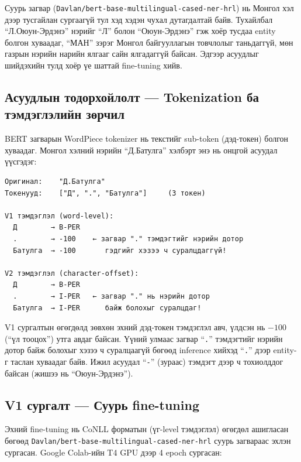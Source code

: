 Суурь загвар (\texttt{Davlan/bert-base-multilingual-cased-ner-hrl}) нь Монгол хэл дээр тусгайлан сургаагүй тул хэд хэдэн чухал дутагдалтай байв. Тухайлбал ``Л.Оюун-Эрдэнэ'' нэрийг ``Л'' болон ``Оюун-Эрдэнэ'' гэж хоёр тусдаа entity болгон хуваадаг, ``МАН'' зэрэг Монгол байгууллагын товчлолыг таньдаггүй, мөн газрын нэрийн нарийн ялгааг сайн ялгадаггүй байсан. Эдгээр асуудлыг шийдэхийн тулд хоёр үе шаттай fine-tuning хийв.

\subsection{Асуудлын тодорхойлолт — Tokenization ба тэмдэглэлийн зөрчил}

BERT загварын WordPiece tokenizer нь текстийг sub-token (дэд-токен) болгон хуваадаг. Монгол хэлний нэрийн ``Д.Батулга'' хэлбэрт энэ нь онцгой асуудал үүсгэдэг:

\begin{lstlisting}[caption={WordPiece tokenization — цэг дээр хуваагдах жишээ}, basicstyle=\small\ttfamily, breaklines=true, frame=single]
Оригинал:    "Д.Батулга"
Токенууд:    ["Д", ".", "Батулга"]     (3 токен)

V1 тэмдэглэл (word-level):
  Д        → B-PER
  .        → -100    ← загвар "." тэмдэгтийг нэрийн дотор
  Батулга  → -100       гэдгийг хэзээ ч суралцдаггүй!

V2 тэмдэглэл (character-offset):
  Д        → B-PER
  .        → I-PER   ← загвар "." нь нэрийн дотор
  Батулга  → I-PER      байж болохыг суралцдаг!
\end{lstlisting}

V1 сургалтын өгөгдөлд зөвхөн эхний дэд-токен тэмдэглэл авч, үлдсэн нь $-100$ (``үл тооцох'') утга авдаг байсан. Үүний улмаас загвар ``\texttt{.}'' тэмдэгтийг нэрийн дотор байж болохыг хэзээ ч суралцаагүй бөгөөд inference хийхэд ``\texttt{.}'' дээр entity-г таслан хуваадаг байв. Ижил асуудал ``\texttt{-}'' (зураас) тэмдэгт дээр ч тохиолддог байсан (жишээ нь ``Оюун-Эрдэнэ'').

\subsection{V1 сургалт — Суурь fine-tuning}

Эхний fine-tuning нь CoNLL форматын (үг-level тэмдэглэл) өгөгдөл ашигласан бөгөөд \texttt{Davlan/bert-base-multilingual-cased-ner-hrl} суурь загвараас эхлэн сургасан. Google Colab-ийн T4 GPU дээр 4 epoch сургасан:

